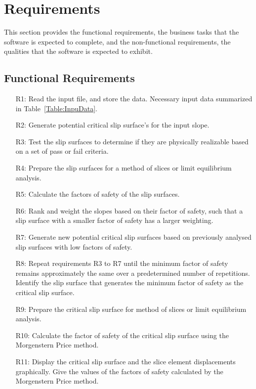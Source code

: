 \documentclass[12pt]{article}
\begin{document}
\section{Requirements}
\label{Sec:Requ}
This section provides the functional requirements, the business tasks that the software is expected to complete, and the non-functional requirements, the qualities that the software is expected to exhibit.
\subsection{Functional Requirements}
\label{Sec:FuncRequ}
\begin{itemize}
\item[R1:]Read the input file, and store the data. Necessary input data summarized in Table~\ref{Table:InpuData}.
\item[R2:]Generate potential critical slip surface's for the input slope.
\item[R3:]Test the slip surfaces to determine if they are physically realizable based on a set of pass or fail criteria.
\item[R4:]Prepare the slip surfaces for a method of slices or limit equilibrium analysis.
\item[R5:]Calculate the factors of safety of the slip surfaces.
\item[R6:]Rank and weight the slopes based on their factor of safety, such that a slip surface with a smaller factor of safety has a larger weighting.
\item[R7:]Generate new potential critical slip surfaces based on previously analysed slip surfaces with low factors of safety.
\item[R8:]Repeat requirements R3 to R7 until the minimum factor of safety remains approximately the same over a predetermined number of repetitions. Identify the slip surface that generates the minimum factor of safety as the critical slip surface.
\item[R9:]Prepare the critical slip surface for method of slices or limit equilibrium analysis.
\item[R10:]Calculate the factor of safety of the critical slip surface using the Morgenstern Price method.
\item[R11:]Display the critical slip surface and the slice element displacements graphically. Give the values of the factors of safety calculated by the Morgenstern Price method.
\end{itemize}
\end{document}
